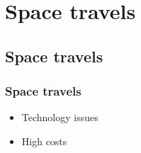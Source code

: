 \section{Space travels}

\subsection{Space travels}
\begin{frame}
\frametitle{Space travels}
\begin{itemize}
    \itemsep1.5em
    \item Technology issues
    \item High costs
\end{itemize}
\end{frame}

